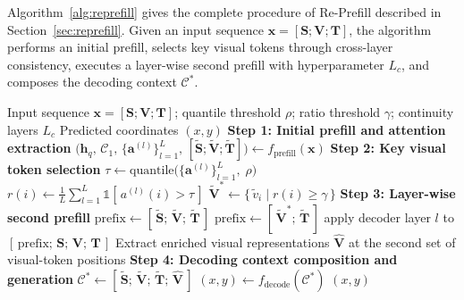 \documentclass{article}
\begin{document}
Algorithm~\ref{alg:reprefill} gives the complete procedure of Re-Prefill described in Section~\ref{sec:reprefill}.
Given an input sequence $\mathbf{x} = [\mathbf{S}; \mathbf{V}; \mathbf{T}]$, the algorithm performs an initial prefill, 
selects key visual tokens through cross-layer consistency, executes a layer-wise second prefill with hyperparameter $L_c$, 
and composes the decoding context $\mathcal{C}^{*}$.

\begin{algorithm}[!htbp]
\caption{Re-Prefill Inference}
\label{alg:reprefill}
\begin{algorithmic}[1]
\REQUIRE Input sequence $\mathbf{x} = [\mathbf{S}; \mathbf{V}; \mathbf{T}]$; quantile threshold $\rho$; ratio threshold $\gamma$; continuity layers $L_c$
\ENSURE Predicted coordinates $(x, y)$
\vspace{0.5em}
\STATE \textbf{Step 1: Initial prefill and attention extraction}
\STATE $\bigl(\mathbf{h}_q,\, \mathcal{C}_1,\, \{\mathbf{a}^{(l)}\}_{l=1}^{L},\, [\tilde{\mathbf{S}};\tilde{\mathbf{V}};\tilde{\mathbf{T}}]\bigr) \leftarrow f_{\mathrm{prefill}}(\mathbf{x})$
\vspace{0.8em}
\STATE \textbf{Step 2: Key visual token selection}
\STATE $\tau \leftarrow \mathrm{quantile}\bigl(\{\mathbf{a}^{(l)}\}_{l=1}^{L},\; \rho\bigr)$
    \STATE $r(i) \leftarrow \frac{1}{L} \sum_{l=1}^{L} \mathds{1}[\,a^{(l)}(i) > \tau\,]$
\ENDFOR
\STATE $\tilde{\mathbf{V}}^{*} \leftarrow \{\, \tilde{v}_i \mid r(i) \geq \gamma \,\}$
\vspace{0.8em}
\STATE \textbf{Step 3: Layer-wise second prefill}
        \STATE $\mathrm{prefix} \leftarrow [\,\tilde{\mathbf{S}};\,\tilde{\mathbf{V}};\,\tilde{\mathbf{T}}\,]$
    \ELSE
        \STATE $\mathrm{prefix} \leftarrow [\,\tilde{\mathbf{V}}^{*};\,\tilde{\mathbf{T}}\,]$
    \ENDIF
    \STATE apply decoder layer $l$ to $[\,\mathrm{prefix};\,\mathbf{S};\,\mathbf{V};\,\mathbf{T}\,]$
\ENDFOR
\STATE Extract enriched visual representations $\hat{\mathbf{V}}$ at the second set of visual-token positions
\vspace{0.8em}
\STATE \textbf{Step 4: Decoding context composition and generation}
\STATE $\mathcal{C}^{*} \leftarrow [\,\tilde{\mathbf{S}};\,\tilde{\mathbf{V}};\,\tilde{\mathbf{T}};\,\hat{\mathbf{V}}\,]$
\STATE $(x, y) \leftarrow f_{\mathrm{decode}}(\mathcal{C}^{*})$
\RETURN $(x, y)$
\end{algorithmic}
\end{algorithm}
\end{document}
